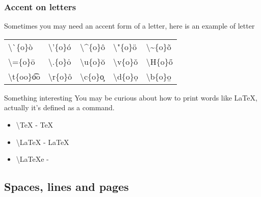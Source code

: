 \documentclass{beamer}
\newcommand{\sampleaccent}[3]{\alert{\textbackslash #1}\{#3\}\quad #2{#3}}
\begin{document}
\begin{frame}
	\frametitle{Accent on letters}
	Sometimes you may need an accent form of a letter, here is an example of letter 
	\begin{center}
	\begin{tabular}{lllll}
		\sampleaccent{\`{}}{\`}{o} & \sampleaccent{'}{\'}{o} & \sampleaccent{\^{}}{\^}{o} & \sampleaccent{"}{\"}{o} & \sampleaccent{\~{}}{\~}{o} \\
		\sampleaccent{=}{\=}{o} & \sampleaccent{.}{\.}{o} & \sampleaccent{u}{\u}{o} & \sampleaccent{v}{\v}{o} & \sampleaccent{H}{\H}{o}\\
		\sampleaccent{t}{\t}{oo} & \sampleaccent{r}{\r}{o} & \sampleaccent{c}{\c}{o} & \sampleaccent{d}{\d}{o} & \sampleaccent{b}{\b}{o}
	\end{tabular}
	\end{center}
	\begin{block}{Something interesting}
		You may be curious about how to print words like \LaTeX, actually it's defined as a command.
		\begin{itemize}
			\item \alert{\textbackslash TeX} - \TeX
			\item \alert{\textbackslash LaTeX} - \LaTeX
			\item \alert{\textbackslash LaTeXe} - \LaTeXe
		\end{itemize}
	\end{block}
\end{frame}

\subsection{Spaces, lines and pages}
\end{document}
